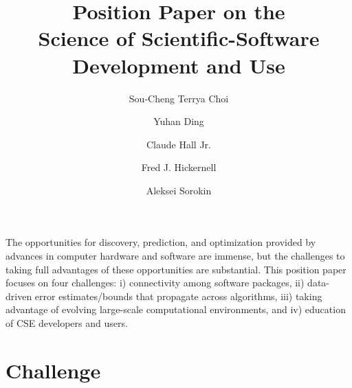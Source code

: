 \documentclass{amsart}
\begin{document}
\title{Position Paper on the \\ Science of Scientific-Software Development and Use}
\author{\vspace{-2ex}Sou-Cheng Terrya Choi}
\address[Choi, Ding, Hickernell, Sorokin]{Department of Applied Mathematics, RE 220, 10 W. 32nd St., Chicago, IL 60616}
\author{Yuhan Ding}
\author{Claude Hall Jr.}
\address[Hall]{Birmingham Southern College, 900 Arkadelpha Rd, Birmingham, AL, 35254}
\author{Fred J. Hickernell}
\author{Aleksei Sorokin}


\maketitle

\vspace{-5ex}

The opportunities for discovery, prediction, and optimization provided by advances in computer hardware and software are immense, but the challenges to taking full advantages of these opportunities are substantial.  
This position paper focuses on four challenges: i) connectivity among software packages, ii) data-driven error estimates/bounds that propagate across algorithms, iii) taking advantage of evolving large-scale computational environments, and iv) education of CSE developers and users.


\section{Challenge} %
\end{document}

